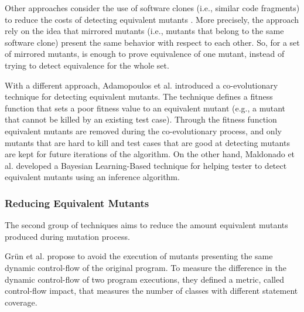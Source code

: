 Other approaches consider the use of software clones (i.e., similar code fragments) to reduce the costs of detecting equivalent mutants \cite{kintis2013identifying}. More precisely, the approach rely on the idea that mirrored mutants (i.e., mutants that belong to the same software clone) present the same behavior with respect to each other. So, for a set of mirrored mutants, is enough to prove equivalence of one mutant, instead of trying to detect equivalence for the whole set.

With a different approach, Adamopoulos et al. \cite{adamopoulos2004overcome} introduced a co-evolutionary technique for detecting equivalent mutants. The technique defines a fitness function that sets a poor fitness value to an equivalent mutant (e.g., a mutant that cannot be killed by an existing test case). Through the fitness function equivalent mutants are removed during the co-evolutionary process, and only mutants that are hard to kill and test cases that are good at detecting mutants are kept for future iterations of the algorithm. On the other hand, Maldonado et al. \cite{maldonado2005bayesian} developed a Bayesian Learning-Based technique for helping tester to detect equivalent mutants using an inference algorithm.

\subsubsection{Reducing Equivalent Mutants}

The second group of techniques aims to reduce the amount equivalent mutants produced during mutation process.

Gr\"{u}n et al. \cite{grun2009impact} propose to avoid the execution of mutants presenting the same dynamic control-flow of the original program.
To measure the difference in the dynamic control-flow of two program executions, they defined a metric, called control-flow impact, that measures
the number of classes with different statement coverage.

